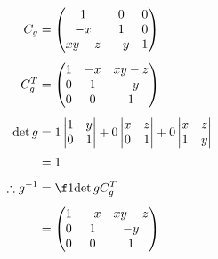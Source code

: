 \documentclass[a4paper]{article}
\begin{document}
\begin{align*}
%
C_g &= \begin{pmatrix}
1 & 0 & 0 \\
-x & 1 & 0 \\
xy - z & -y & 1
\end{pmatrix} \\[1ex]
%
C_g^T &= \begin{pmatrix}
1 & -x & xy - z \\
0 & 1 & -y \\
0 & 0 & 1
\end{pmatrix} \\[1ex]
%
\det g &=
1 \begin{vmatrix} 1 & y \\ 0 & 1 \end{vmatrix}
+ 0 \begin{vmatrix} x & z \\ 0 & 1 \end{vmatrix}
+ 0 \begin{vmatrix} x & z \\ 1 & y \end{vmatrix} \\[0.5ex]
&= 1 \\[1ex]
%
\therefore g^{-1} &= \f1{\det g} C_g^T \\[1ex]
&= \begin{pmatrix}
    1 & -x & xy - z \\
    0 & 1 & -y \\
    0 & 0 & 1
\end{pmatrix}
\end{align*}
\end{document}
